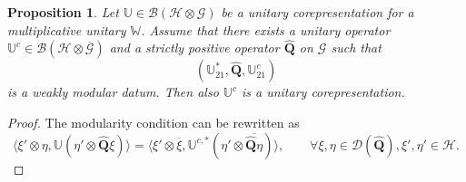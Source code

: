 \documentclass[11pt, reqno]{amsart}
\newtheorem{prop}[theorem]{Proposition}
\theoremstyle{definition}
\numberwithin{equation}{section}
\def\msD{\mathscr D}
\def\Gc{\mathcal G}
\def\Hc{\mathcal H}
\newcommand{\Bc}{\mathcal{B}}
\newcommand{\Qb}{\mathbf{Q}}
\newcommand{\Wbb}{\mathbb{W}}
\newcommand{\Ubb}{\mathbb{U}}
\begin{document}
\begin{prop}\label{PropContraIsUnitCorep}
Let $\Ubb \in \Bc(\Hc\otimes \Gc)$ be a unitary corepresentation for a multiplicative unitary $\Wbb$. Assume that there exists a unitary operator $\Ubb^c \in \Bc(\Hc\otimes \overline{\Gc})$ and a strictly positive operator $\hat{\Qb}$ on $\Gc$ such that \begin{equation}\label{EqObsWeakContra}
(\Ubb_{21}^*,\hat{\Qb},\Ubb_{21}^c)
\end{equation}
is a weakly modular datum. Then also $\Ubb^c$ is a unitary corepresentation. 
\end{prop} 
\begin{proof}
The modularity condition can be rewritten as
\begin{equation}\label{EqRightInvOpAltCorep}
\langle \xi'\otimes \eta,\Ubb(\eta'\otimes \hat{\Qb}\xi)\rangle = \langle \xi'\otimes \overline{\xi},\Ubb^{c,*}(\eta'\otimes \overline{\hat{\Qb}\eta})\rangle,\qquad \forall \xi,\eta\in \msD(\hat{\Qb}),\xi',\eta'\in \Hc.
\end{equation}


\end{proof}
\end{document}
